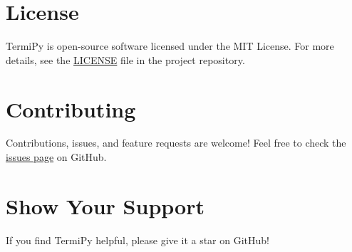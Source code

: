 \documentclass[
  letterpaper,
  DIV=11,
  numbers=noendperiod]{scrreprt}
\begin{document}
\section*{License}\label{license-1}


TermiPy is open-source software licensed under the MIT License. For more
details, see the
\href{https://github.com/pr2tik1/termipy/blob/main/LICENSE}{LICENSE}
file in the project repository.

\section*{Contributing}\label{contributing}


Contributions, issues, and feature requests are welcome! Feel free to
check the \href{https://github.com/pr2tik1/termipy/issues}{issues page}
on GitHub.

\section*{Show Your Support}\label{show-your-support}


If you find TermiPy helpful, please give it a star on GitHub!
\end{document}
